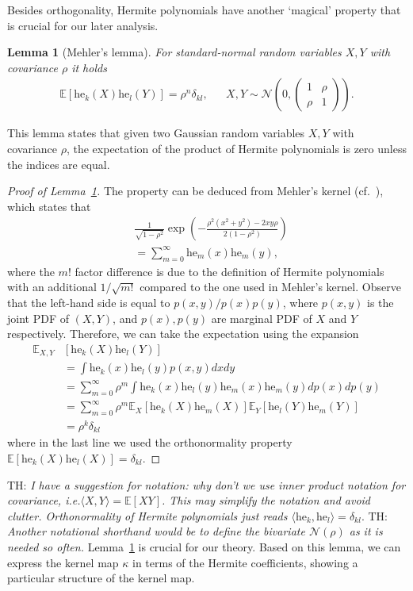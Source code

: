 \documentclass[twoside]{article}
\newcommand{\E}{\mathbb{E}}
\newcommand{\he}{\mathrm{he}}
\newtheorem{lemma}{Lemma}
\theoremstyle{definition}
\newcommand{\thomas}[1]{{\color{blue}TH:  \textit{#1}}}
\begin{document}

Besides orthogonality, Hermite polynomials have another `magical' property that is crucial for our later analysis. 

\begin{lemma}[Mehler's lemma]\label{lem:mehler_kernel}
For standard-normal random variables $X,Y$ with covariance $\rho$ it holds
\begin{align*}
\E\left[\he_k(X)\he_l(Y)\right] = \rho^n \delta_{kl}, && X, Y\sim \mathcal N\left(0, \begin{pmatrix} 1 & \rho \\ \rho & 1 \end{pmatrix}
 \right).
\end{align*}
\end{lemma}

This lemma states that given two Gaussian random variables $X, Y$ with covariance $\rho$, the expectation of the product of Hermite polynomials is zero unless the indices are equal. 

\begin{proof}[Proof of Lemma~\ref{lem:mehler_kernel}]
The property can be deduced from Mehler's kernel (cf.~\citep{mehler1866ueber}), which states that 
\begin{align*}
&\frac{1}{\sqrt{1-\rho^2}}\exp\left(-\frac{\rho^2(x^2+y^2)-2xy\rho}{2(1-\rho^2)}\right) \\
&= \sum_{m=0}^\infty \he_m(x)\he_m(y),
\end{align*}
where the $m!$ factor difference is due to the definition of Hermite polynomials with an additional $1/\sqrt{m!}$ compared to the one used in Mehler's kernel. 
Observe that the left-hand side is equal to $p(x,y)/p(x)p(y)$, where $p(x,y)$ is the joint PDF of $(X, Y)$, and $p(x),p(y)$ are marginal PDF of $X$ and $Y$ respectively. Therefore, we can take the expectation using the expansion 
\begin{align*}
\E_{X,Y}&\left[ \he_k(X) \he_l(Y)\right] \\
&= \int \he_k(x)\he_l(y)p(x,y)dx dy \\
&=  \sum_{m=0}^\infty \rho^m\int \he_k(x)\he_l(y) \he_m(x)\he_m(y) dp(x)dp(y)\\
&= \sum_{m=0}^\infty \rho^m\E_{X} \left[\he_k(X)\he_m(X)\right]\E_{Y} \left[\he_l(Y)\he_m(Y)\right] \\
&= \rho^k \delta_{kl} 
\end{align*}
where in the last line we used the orthonormality property $\E[\he_k(X) \he_l(X)]=\delta_{kl}$. 
\end{proof}
\thomas{I have a suggestion for notation: why don't we use inner product notation for covariance, i.e.$\langle X,Y \rangle = \E[XY]$. This may simplify the notation and avoid clutter. Orthonormality of Hermite polynomials just reads $\langle \he_k, \he_l \rangle = \delta_{kl}$}. \thomas{Another notational shorthand would be to define the bivariate $\mathcal N(\rho)$ as it is needed so often.}
Lemma~\ref{lem:mehler_kernel} is crucial for our theory. Based on this lemma, we can express the kernel map $\kappa$ in terms of the Hermite coefficients, showing a particular structure of the kernel map.
\end{document}
